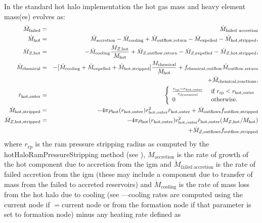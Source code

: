 In the standard hot halo implementation the hot gas mass and heavy element mass(es) evolves as:
\begin{eqnarray}
 \dot{M}_\mathrm{failed} &=& \dot{M}_\mathrm{failed~accretion} \\
 \dot{M}_\mathrm{hot} &=& \dot{M}_\mathrm{accretion} - \dot{M}_\mathrm{cooling} + \dot{M}_\mathrm{outflow,return} - \dot{M}_\mathrm{expelled} - \dot{M}_\mathrm{hot, stripped}, \\
 \dot{M}_{Z, \mathrm{hot}} &=& - \dot{M}_\mathrm{cooling} {M_{Z, \mathrm{hot}}\over M_\mathrm{hot}} + \dot{M}_{Z, \mathrm{outflow,return}} - \dot{M}_{Z,\mathrm{expelled}} - \dot{M}_{Z, \mathrm{hot, stripped}}, \\
 \dot{M}_\mathrm{chemical} &=& - [\dot{M}_\mathrm{cooling} + \dot{M}_\mathrm{expelled} + \dot{M}_\mathrm{hot, stripped}] {M_\mathrm{chemical}\over M_\mathrm{hot}} + f_\mathrm{chemical,outflow} \dot{M}_\mathrm{outflow,return} \nonumber \\ 
& & + \dot{M}_\mathrm{chemical,reactions}, \\
\dot{r}_\mathrm{hot, outer} &=& \left\{ \begin{array}{ll} {r_\mathrm{rp} - r_\mathrm{hot, outer} \over \tau_\mathrm{dynamical}} & \hbox{ if } r_\mathrm{rp} < r_\mathrm{hot, outer} \\ 0 & \hbox{ otherwise.} \end{array} \right. \\
\dot{M}_\mathrm{hot, stripped} &=& -4 \pi \rho_\mathrm{hot}(r_\mathrm{hot, outer}) r_\mathrm{hot, outer}^2 \dot{r}_\mathrm{hot, outer} + \dot{M}_\mathrm{outflows} f_\mathrm{outflow, stripped} \\
\dot{M}_{Z, \mathrm{hot, stripped}} &=& -4 \pi \rho_\mathrm{hot}(r_\mathrm{hot, outer}) r_\mathrm{hot, outer}^2 \dot{r}_\mathrm{hot, outer} (M_{Z, \mathrm{hot}} / M_\mathrm{hot}) \nonumber \\
 & & + \dot{M}_{Z, \mathrm{outflows}} f_\mathrm{outflow, stripped}  
\end{eqnarray}
where $r_\mathrm{rp}$ is the ram pressure stripping radius as computed by the {\normalfont \ttfamily hotHaloRamPressureStripping} method (see ), $\dot{M}_\mathrm{accretion}$ is the rate of growth of the hot \gls{component} due to accretion from the \gls{igm} and $\dot{M}_\mathrm{failed~accretion}$ is the rate of failed accretion from the \gls{igm} (these may include a \gls{component} due to transfer of mass from the failed to accreted reservoirs) and $\dot{M}_\mathrm{cooling}$ is the rate of mass loss from the hot halo due to cooling (see ---cooling rates are computed using the current \gls{node} if {\normalfont \ttfamily [hotHaloCoolingFromNode]}$=${\normalfont \ttfamily current node} or from the formation \gls{node} if that parameter is set to {\normalfont \ttfamily formation node}) minus any heating rate defined as
